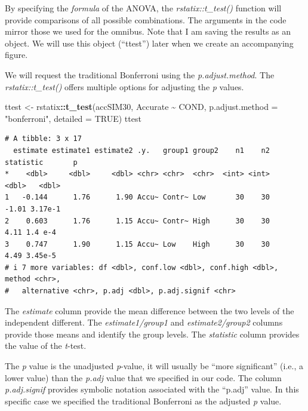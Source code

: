\documentclass[
  11pt,
]{book}
\newenvironment{Shaded}{\begin{snugshade}}{\end{snugshade}}
\newcommand{\AttributeTok}[1]{\textcolor[rgb]{0.27,0.27,0.27}{#1}}
\newcommand{\ConstantTok}[1]{\textcolor[rgb]{0.37,0.37,0.37}{#1}}
\newcommand{\FunctionTok}[1]{\textcolor[rgb]{0.27,0.27,0.27}{\textbf{#1}}}
\newcommand{\NormalTok}[1]{#1}
\newcommand{\OtherTok}[1]{\textcolor[rgb]{0.37,0.37,0.37}{#1}}
\newcommand{\SpecialCharTok}[1]{\textcolor[rgb]{0.43,0.43,0.43}{\textbf{#1}}}
\newcommand{\StringTok}[1]{\textcolor[rgb]{0.5,0.5,0.5}{#1}}
\begin{document}
By specifying the \emph{formula} of the ANOVA, the \emph{rstatix::t\_test()} function will provide comparisons of all possible combinations. The arguments in the code mirror those we used for the omnibus. Note that I am saving the results as an object. We will use this object (``ttest'') later when we create an accompanying figure.

We will request the traditional Bonferroni using the \emph{p.adjust.method}. The \emph{rstatix::t\_test()} offers multiple options for adjusting the \emph{p} values.

\begin{Shaded}
\begin{Highlighting}[]
\NormalTok{ttest }\OtherTok{\textless{}{-}}\NormalTok{ rstatix}\SpecialCharTok{::}\FunctionTok{t\_test}\NormalTok{(accSIM30, Accurate }\SpecialCharTok{\textasciitilde{}}\NormalTok{ COND, }\AttributeTok{p.adjust.method =} \StringTok{"bonferroni"}\NormalTok{,}
    \AttributeTok{detailed =} \ConstantTok{TRUE}\NormalTok{)}
\NormalTok{ttest}
\end{Highlighting}
\end{Shaded}

\begin{verbatim}
# A tibble: 3 x 17
  estimate estimate1 estimate2 .y.   group1 group2    n1    n2 statistic       p
*    <dbl>     <dbl>     <dbl> <chr> <chr>  <chr>  <int> <int>     <dbl>   <dbl>
1   -0.144      1.76      1.90 Accu~ Contr~ Low       30    30     -1.01 3.17e-1
2    0.603      1.76      1.15 Accu~ Contr~ High      30    30      4.11 1.4 e-4
3    0.747      1.90      1.15 Accu~ Low    High      30    30      4.49 3.45e-5
# i 7 more variables: df <dbl>, conf.low <dbl>, conf.high <dbl>, method <chr>,
#   alternative <chr>, p.adj <dbl>, p.adj.signif <chr>
\end{verbatim}

The \emph{estimate} column provide the mean difference between the two levels of the independent different. The \emph{estimate1/group1} and \emph{estimate2/group2} columns provide those means and identify the group levels. The \emph{statistic} column provides the value of the \emph{t}-test.

The \emph{p} value is the unadjusted \emph{p}-value, it will usually be ``more significant'' (i.e., a lower value) than the \emph{p.adj} value that we specified in our code. The column \emph{p.adj.signif} provides symbolic notation associated with the ``p.adj'' value. In this specific case we specified the traditional Bonferroni as the adjusted \emph{p} value.
\end{document}
